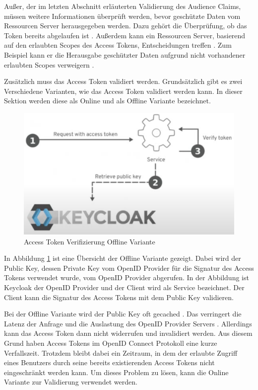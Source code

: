 Außer, der im letzten Abschnitt erläuterten Validierung des Audience Claims, müssen weitere Informationen überprüft werden, bevor geschützte Daten vom Ressourcen Server herausgegeben werden. Dazu gehört die Überprüfung, ob das Token bereits abgelaufen ist \cite[Sec. 4.1.4]{RFC7519}. Außerdem kann ein Ressourcen Server, basierend auf den erlaubten Scopes des Access Tokens, Entscheidungen treffen \cite[Sec. 3.3]{RFC6749}. Zum Beispiel kann er die Herausgabe geschützter Daten aufgrund nicht vorhandener erlaubten Scopes verweigern \cite[Sec. 3.3]{RFC6749}.

Zusätzlich muss das Access Token validiert werden. Grundsätzlich gibt es zwei Verschiedene Varianten, wie das Access Token validiert werden kann. In dieser Sektion werden diese als Online und als Offline Variante bezeichnet.

\begin{figure}[!ht]
	\centering
	\includegraphics[width=.8\textwidth]{Images/Ebert/VerifyAccessTokenOffline.PNG}
	\caption{Access Token Verifizierung Offline Variante \cite{EB32}}
	\label{fig:EB_Access Token Verifizierung Offline Variante}
\end{figure}

In Abbildung \ref{fig:EB_Access Token Verifizierung Offline Variante} ist eine Übersicht der Offline Variante gezeigt. Dabei wird der Public Key, dessen Private Key vom OpenID Provider für die Signatur des Access Tokens verwendet wurde, vom OpenID Provider abgerufen. In der Abbildung ist Keycloak der OpenID Provider und der Client wird als Service bezeichnet. Der Client kann die Signatur des Access Tokens mit dem Public Key validieren.

Bei der Offline Variante wird der Public Key oft gecached \cite{EB32}. Das verringert die Latenz der Anfrage und die Auslastung des OpenID Provider Servers \cite{EB32}. Allerdings kann das Access Token dann nicht widerrufen und invalidiert werden. Aus diesem Grund haben Access Tokens im OpenID Connect Protokoll eine kurze Verfallszeit. Trotzdem bleibt dabei ein Zeitraum, in dem der erlaubte Zugriff eines Benutzers durch seine bereits existierenden Access Tokens nicht eingeschränkt werden kann. Um dieses Problem zu lösen, kann die Online Variante zur Validierung verwendet werden. %


